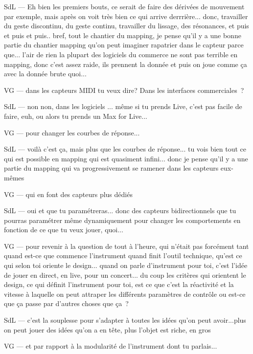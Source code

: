 SdL — Eh bien les premiers bouts, ce serait de faire des dérivées de mouvement par exemple, mais après on voit très bien ce qui arrive derrrière... donc, travailler du geste discontinu, du geste continu, travailler du lissage, des résonances, et puis et puis et puis.. bref, tout le chantier du mapping, je pense qu'il y a une bonne partie du chantier mapping qu'on peut imaginer rapatrier dans le capteur parce que... l'air de rien la plupart des logiciels du commerce ne sont pas terrible en mapping, donc c'est assez raide, ils prennent la donnée et puis on joue comme ça avec la donnée brute quoi... 

VG — dans les capteurs MIDI tu veux dire? Dans les interfaces commerciales ? 

SdL — non non, dans les logiciels ... même si tu prends Live, c'est pas facile de faire, euh, ou alors tu prends un Max for Live... 

VG — pour changer les courbes de réponse... 

SdL — voilà c'est ça, mais plus que les courbes de réponse... tu vois bien tout ce qui est possible en mapping qui est quasiment infini... donc je pense qu'il y a une partie du mapping qui va progressivement se ramener dans les capteurs eux-mêmes 

VG — qui en font des capteurs plus dédiés 

SdL — oui et que tu paramétreras... donc des capteurs bidirectionnels que tu pourras paramétrer même dynamiquement pour changer les comportements en fonction de ce que tu veux jouer, quoi... 

VG — pour revenir à la question de tout à l'heure, qui n'était pas forcément tant quand est-ce que commence l'instrument quand finit l'outil technique, qu'est ce qui selon toi oriente le design... quand on parle d'instrument pour toi, c'est l'idée de jouer en direct, en live, pour un concert... du coup les critères qui orientent le design, ce qui définit l'instrument pour toi, est ce que c'est la réactivité et la vitesse à laquelle on peut attraper les différents paramètres de contrôle ou est-ce que ça passe par d'autres choses que ça ? 

SdL — c'est la souplesse pour s'adapter à toutes les idées qu'on peut avoir...plus on peut jouer des idées qu'on a en tête, plus l'objet est riche, en gros 

VG — et par rapport à la modularité de l'instrument dont tu parlais... 

